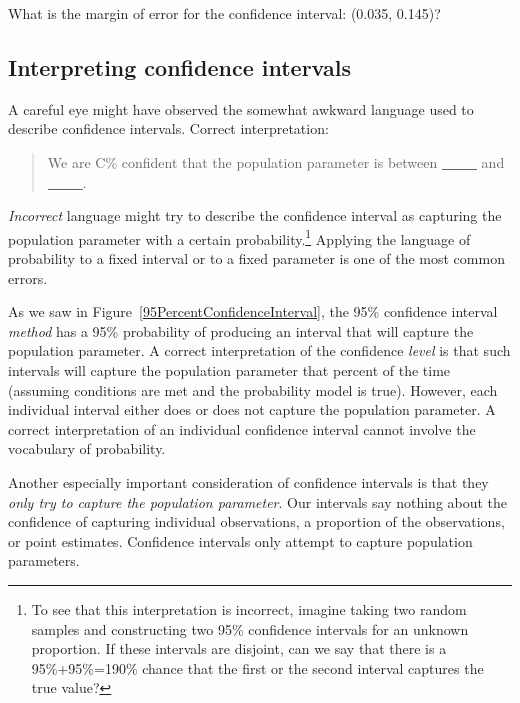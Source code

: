 \begin{exercisewrap}
\begin{nexercise}What is the margin of error for the confidence interval: (0.035, 0.145)?\footnotemark
\end{nexercise}
\end{exercisewrap}

\subsection{Interpreting confidence intervals}
\label{interpretingCIs}


A careful eye might have observed the somewhat awkward language used to describe confidence intervals. Correct interpretation:
\begin{quote}
We are C\% confident that the population parameter is between \underline{\ \ \ \ \ } and \underline{\ \ \ \ \ }.
\end{quote}
\emph{Incorrect} language might try to describe the confidence interval as capturing the population parameter with a certain probability.\footnote{To see that this interpretation is incorrect, imagine taking two random samples and constructing two 95\% confidence intervals for an unknown proportion. If these intervals are disjoint, can we say that there is a 95\%+95\%=190\% chance that the first or the second interval captures the true value?} Applying the language of probability to a fixed interval or to a fixed parameter is one of the most common errors.  

As we saw in Figure~\ref{95PercentConfidenceInterval}, the 95\% confidence interval \emph{method} has a 95\% probability of producing an interval that will capture the population parameter. A correct interpretation of the confidence \emph{level} is that such intervals will capture the population parameter that percent of the time (assuming conditions are met and the probability model is true). However, each individual interval either does or does not capture the population parameter. A correct interpretation of an individual confidence interval cannot involve the vocabulary of probability.

Another especially important consideration of confidence intervals is that they \emph{only try to capture the population parameter}. Our intervals say nothing about the confidence of capturing individual observations, a proportion of the observations, or point estimates. Confidence intervals only attempt to capture population parameters.

